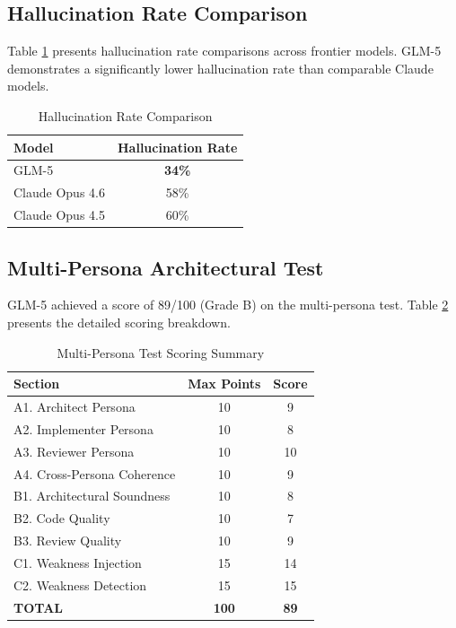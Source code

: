\documentclass[conference]{IEEEtran}
\begin{document}
\subsection{Hallucination Rate Comparison}
Table \ref{tab:hallucination} presents hallucination rate comparisons across frontier models. GLM-5 demonstrates a significantly lower hallucination rate than comparable Claude models.

\begin{table}[H]
\caption{Hallucination Rate Comparison}
\label{tab:hallucination}
\centering
\begin{tabular}{lc}
\toprule
\textbf{Model} & \textbf{Hallucination Rate} \\
\midrule
GLM-5 & \textbf{34\%} \\
Claude Opus 4.6 & 58\% \\
Claude Opus 4.5 & 60\% \\
\bottomrule
\end{tabular}
\end{table}

\subsection{Multi-Persona Architectural Test}
GLM-5 achieved a score of 89/100 (Grade B) on the multi-persona test. Table \ref{tab:persona_scores} presents the detailed scoring breakdown.

\begin{table}[H]
\caption{Multi-Persona Test Scoring Summary}
\label{tab:persona_scores}
\centering
\begin{tabular}{lcc}
\toprule
\textbf{Section} & \textbf{Max Points} & \textbf{Score} \\
\midrule
A1. Architect Persona & 10 & 9 \\
A2. Implementer Persona & 10 & 8 \\
A3. Reviewer Persona & 10 & 10 \\
A4. Cross-Persona Coherence & 10 & 9 \\
\midrule
B1. Architectural Soundness & 10 & 8 \\
B2. Code Quality & 10 & 7 \\
B3. Review Quality & 10 & 9 \\
\midrule
C1. Weakness Injection & 15 & 14 \\
C2. Weakness Detection & 15 & 15 \\
\midrule
\textbf{TOTAL} & \textbf{100} & \textbf{89} \\
\bottomrule
\end{tabular}
\end{table}
\end{document}
